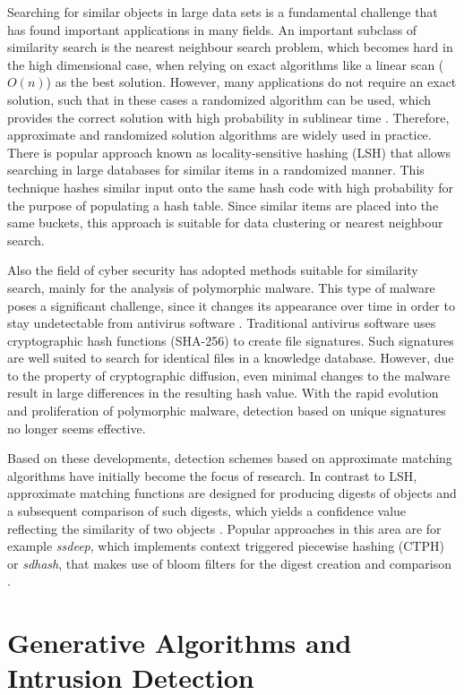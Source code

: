 Searching for similar objects in large data sets is a fundamental challenge that has found important applications in many fields. An important subclass of similarity search is the nearest neighbour search problem, which becomes hard in the high dimensional case, when relying on exact algorithms like a linear scan ($O(n)$) as the best solution. However, many applications do not require an exact solution, such that in these cases a randomized algorithm can be used, which provides the correct solution with high probability in sublinear time \cite{datar_locality-sensitive_2004}. Therefore, approximate and randomized solution algorithms are widely used in practice. There is  popular approach known as locality-sensitive hashing (LSH) that allows searching in large databases for similar items in a randomized manner. This technique hashes similar input onto the same hash code with high probability for the purpose of populating a hash table. Since similar items are placed into the same buckets, this approach is suitable for data clustering or nearest neighbour search.


Also the field of cyber security has adopted methods suitable for similarity search, mainly for the analysis of polymorphic malware. This type of malware poses a significant challenge, since it changes its appearance over time in order to stay undetectable from antivirus software \cite[p.91]{whitman_principles_2018}. 
Traditional antivirus software uses cryptographic hash functions (SHA-256) to create file signatures. Such signatures are well suited to search for identical files in a knowledge database. However, due to the property of cryptographic diffusion, even minimal changes to the malware result in large differences in the resulting hash value. With the rapid evolution and proliferation of polymorphic malware, detection based on unique signatures no longer seems effective. 

Based on these developments, detection schemes based on approximate matching algorithms have initially become the focus of research. In contrast to LSH, approximate matching functions are designed for producing digests of objects and a subsequent comparison of such digests, which yields a confidence value reflecting the similarity of two objects \cite{moia_similarity_2017}. Popular approaches in this area are for example \textit{ssdeep}, which implements context triggered piecewise hashing (CTPH) \cite{kornblum_identifying_2006} or \textit{sdhash}, that makes use of bloom filters for the digest creation and comparison \cite{chow_data_2010}.

\section{Generative Algorithms and Intrusion Detection}